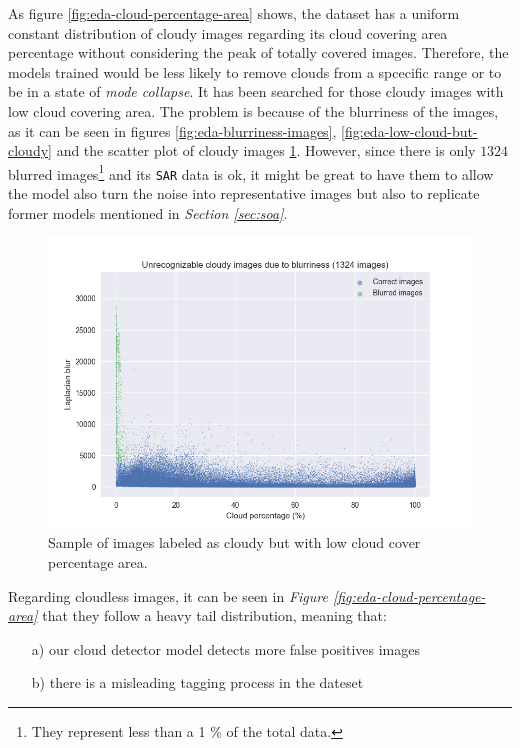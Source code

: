 As figure \ref{fig:eda-cloud-percentage-area} shows, the dataset has a uniform constant distribution of cloudy images regarding its cloud covering area percentage without considering the peak of totally covered images. Therefore, the models trained would be less likely to remove clouds from a spcecific range or to be in a state of \textit{mode collapse}. It has been searched for those cloudy images with low cloud covering area. The problem is because of the blurriness of the images, as it can be seen in figures \ref{fig:eda-blurriness-images}, \ref{fig:eda-low-cloud-but-cloudy} and the scatter plot of cloudy images \ref{fig:eda-cloudy-images-blurred}. However, since there is only $1324$ blurred images\footnote{They represent less than a 1 \% of the total data.} and its \texttt{SAR} data is ok, it might be great to have them to allow the model also turn the noise into representative images but also to replicate former models mentioned in \textit{Section \ref{sec:soa}}.
\begin{figure}[H]
	\centering
	\includegraphics[width=16cm]{imgs/eda/cloudy-images-blurred}
	\caption{Sample of images labeled as cloudy but with low cloud cover percentage area.}
	\label{fig:eda-cloudy-images-blurred}
\end{figure} 
Regarding cloudless images, it can be seen in \textit{Figure \ref{fig:eda-cloud-percentage-area}} that they follow a heavy tail distribution, meaning that:
\begin{enumerate}
	\item[a)] our cloud detector model detects more false positives images
	\item[b)] there is a misleading tagging process in the dateset
\end{enumerate}
